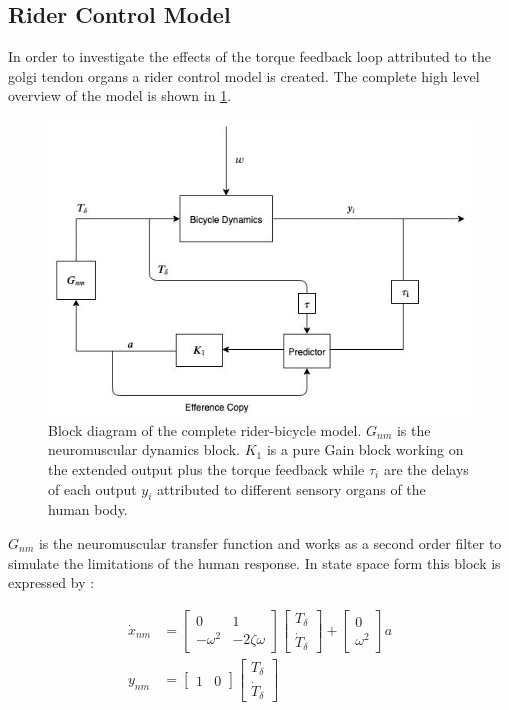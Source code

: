 \subsection{Rider Control Model}\label{subsec:rider_model}

In order to investigate the effects of the torque feedback loop attributed to the golgi tendon organs a rider control model is created. The complete high level overview of the model is shown in \cref{fig:paper3}.
\begin{figure}[ht]
    \centering
    \captionsetup{justification=centering,margin=2cm}

    \includegraphics[scale=0.6]{images/rider_block_overview.jpg}
    \caption{Block diagram of the complete rider-bicycle model. \ensuremath{G_{nm}} is the neuromuscular dynamics block. \ensuremath{K_1} is a pure Gain block working on the extended output plus the torque feedback   while \ensuremath{\tau_i} are the delays of each output \ensuremath{y_i} attributed to different sensory organs of the human body. } 
    \label{fig:paper3}
\end{figure}

\ensuremath{G_{nm}} is the neuromuscular transfer function and works as a second order filter to simulate the limitations of the human response. In state space form this block is expressed by :

\begin{align}
\dot{x}_{nm} &= \begin{bmatrix}0 & 1 \\ -\omega^2 & -2\zeta\omega\end{bmatrix} \begin{bmatrix} T_\delta \\ \dot{T}_\delta\end{bmatrix} + \begin{bmatrix} 0 \\ \omega^2\end{bmatrix} a \\
    y_{nm} &= \begin{bmatrix}1 & 0\end{bmatrix} \begin{bmatrix} T_\delta \\ \dot{T}_\delta\end{bmatrix}
        \label{eq:gnmBLOCK}
\end{align}

